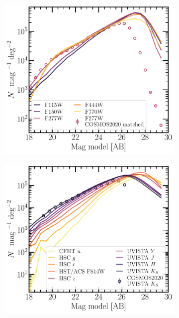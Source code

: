 \documentclass[longauth]{aa}
\begin{document}
\begin{figure}[t!]
  \centering
\begin{subfigure}[b]{0.42\textwidth}
            \includegraphics[width=1\hsize]
            {figures/mag_ncounts_space.pdf}     
  \end{subfigure}
  \begin{subfigure}[b]{0.42\textwidth}
            \includegraphics[width=1\hsize]{figures/mag_ncounts_ground.pdf}     

\end{subfigure}
\end{figure}
\end{document}
